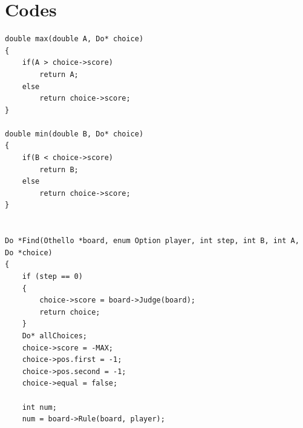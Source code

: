﻿\documentclass[a4paper, 11pt]{article}
\begin{document}
\section{Codes}
\lstset{language=C++}
\begin{lstlisting}
double max(double A, Do* choice)
{
    if(A > choice->score)
        return A;
    else
        return choice->score;
}

double min(double B, Do* choice)
{
    if(B < choice->score)
        return B;
    else
        return choice->score;
}


Do *Find(Othello *board, enum Option player, int step, int B, int A, Do *choice)
{
    if (step == 0)
    {
        choice->score = board->Judge(board);
        return choice;
    }
    Do* allChoices;
    choice->score = -MAX;
    choice->pos.first = -1;
    choice->pos.second = -1;
    choice->equal = false;

    int num;
    num = board->Rule(board, player);


\end{lstlisting}
\end{document}
